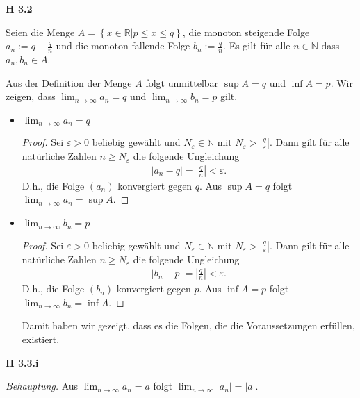 \documentclass[12pt]{extarticle}
\begin{document}
\textbf{H 3.2}

Seien die Menge
\(A = \left\{ x \in \mathbb{R} | p \leq x \leq q \right\}\), die monoton
steigende Folge \(a_n:=q-\frac{q}{n}\) und die monoton fallende Folge
\(b_n:=\frac{q}{n}\).  Es gilt für alle \(n \in \mathbb{N}\) dass $a_n,
b_n \in A$.

\vspace{4mm}

Aus der Definition der Menge \(A\) folgt unmittelbar \(\sup A = q\) und
\(\inf A = p\).  Wir zeigen, dass \(\lim_{n\rightarrow \infty}{a_n}=q\) und
\(\lim_{n\rightarrow \infty}{b_n}=p\) gilt.

\begin{itemize}
\item \(\lim_{n\rightarrow \infty}{a_n}=q\)
  \begin{proof}
    Sei \(\varepsilon >0\) beliebig gewählt und
    \(N_{\varepsilon} \in \mathbb{N}\) mit
    \(N_{\varepsilon} > \left| \frac{q}{\varepsilon} \right|\).  Dann gilt für alle
    natürliche Zahlen \(n \geq N_{\varepsilon}\) die folgende
    Ungleichung
\begin{align*}
  \left| a_n - q \right| = \left| \frac{q}{n} \right|<\varepsilon.
\end{align*}
D.h., die Folge \((a_n)\) konvergiert gegen \(q\).   Aus \(\sup A = q\) folgt
\(\lim_{n\rightarrow \infty}{a_n}=\sup A\).
  \end{proof}
\item \(\lim_{n\rightarrow \infty}{b_n}=p\)
  \begin{proof}
    Sei \(\varepsilon >0\) beliebig gewählt und
    \(N_{\varepsilon} \in \mathbb{N}\) mit
    \(N_{\varepsilon} > \left| \frac{q}{\varepsilon} \right|\).  Dann
    gilt für alle natürliche Zahlen \(n \geq N_{\varepsilon}\) die
    folgende Ungleichung
\begin{align*}
  \left| b_n - p \right| = \left| \frac{q}{n} \right|<\varepsilon.
\end{align*}
D.h., die Folge \((b_n)\) konvergiert gegen \(p\).  Aus \(\inf A = p\) folgt
\(\lim_{n\rightarrow \infty}{b_n}=\inf A\).
\end{proof}

Damit haben wir gezeigt, dass es die Folgen, die die Voraussetzungen
erfüllen, existiert.
\end{itemize}

\textbf{H 3.3.i}

\textit{Behauptung.} Aus \(\lim_{n\rightarrow \infty}{a_n}=a\) folgt
\(\lim_{n \rightarrow \infty}{\left| a_n \right|}= \left| a \right|\).
\end{document}
